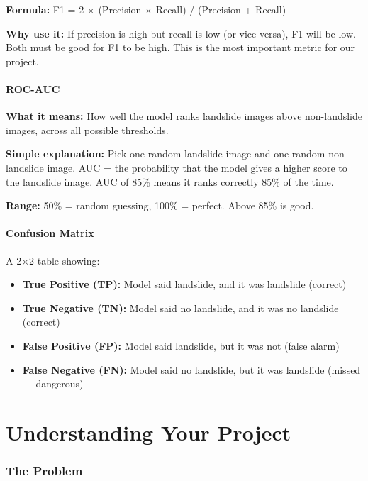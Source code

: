 \documentclass[11pt]{article}
\begin{document}
\textbf{Formula:} F1 = 2 $\times$ (Precision $\times$ Recall) / (Precision + Recall)

\textbf{Why use it:} If precision is high but recall is low (or vice versa), F1 will be low. Both must be good for F1 to be high. This is the most important metric for our project.

\subsection{ROC-AUC}

\textbf{What it means:} How well the model ranks landslide images above non-landslide images, across all possible thresholds.

\textbf{Simple explanation:} Pick one random landslide image and one random non-landslide image. AUC = the probability that the model gives a higher score to the landslide image. AUC of 85\% means it ranks correctly 85\% of the time.

\textbf{Range:} 50\% = random guessing, 100\% = perfect. Above 85\% is good.

\subsection{Confusion Matrix}

A 2$\times$2 table showing:
\begin{itemize}[noitemsep]
    \item \textbf{True Positive (TP):} Model said landslide, and it was landslide (correct)
    \item \textbf{True Negative (TN):} Model said no landslide, and it was no landslide (correct)
    \item \textbf{False Positive (FP):} Model said landslide, but it was not (false alarm)
    \item \textbf{False Negative (FN):} Model said no landslide, but it was landslide (missed --- dangerous)
\end{itemize}

\part{Understanding Your Project}

\section{The Problem}
\end{document}
